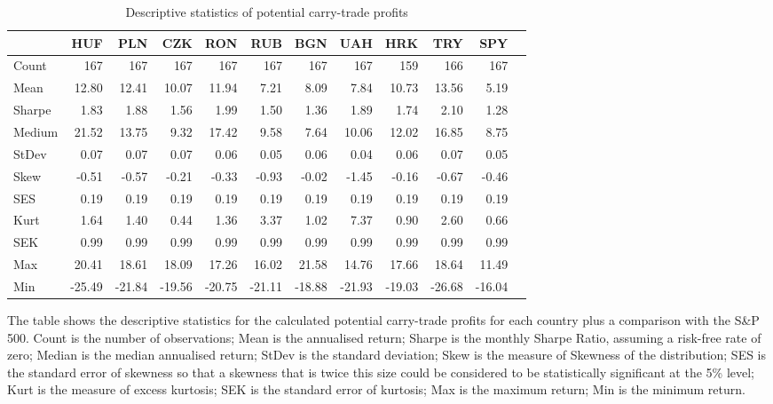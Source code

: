\documentclass[12pt, a4paper, oneside]{article}\usepackage[]{graphicx}\usepackage[]{color}
\begin{document}
\begin{sidewaystable}[p]
\begin{threeparttable}
\centering
\begin{tabular}{p{5cm}rrrrrrrrrrr}
  \hline
 & HUF & PLN & CZK & RON & RUB & BGN & UAH & HRK & TRY & SPY\\ 
  \hline
Count & 167 & 167 & 167 & 167 & 167 & 167 & 167 & 159 & 166 & 167\\ 
  Mean & 12.80 & 12.41 & 10.07 & 11.94 & 7.21 & 8.09 & 7.84 & 10.73 & 13.56 & 5.19\\ 
  Sharpe & 1.83 & 1.88 & 1.56 & 1.99 & 1.50 & 1.36 & 1.89 & 1.74 & 2.10 & 1.28 \\ 
  Medium & 21.52 & 13.75 & 9.32 & 17.42 & 9.58 & 7.64 & 10.06 & 12.02 & 16.85 & 8.75 \\ 
  StDev & 0.07 & 0.07 & 0.07 & 0.06 & 0.05 & 0.06 & 0.04 & 0.06 & 0.07 & 0.05 \\ 
  Skew & -0.51 & -0.57 & -0.21 & -0.33 & -0.93 & -0.02 & -1.45 & -0.16 & -0.67 & -0.46 \\ 
  SES & 0.19 & 0.19 & 0.19 & 0.19 & 0.19 & 0.19 & 0.19 & 0.19 & 0.19 & 0.19\\ 
  Kurt & 1.64 & 1.40 & 0.44 & 1.36 & 3.37 & 1.02 & 7.37 & 0.90 & 2.60 & 0.66\\ 
  SEK & 0.99 & 0.99 & 0.99 & 0.99 & 0.99 & 0.99 & 0.99 & 0.99 & 0.99 & 0.99\\ 
  Max & 20.41 & 18.61 & 18.09 & 17.26 & 16.02 & 21.58 & 14.76 & 17.66 & 18.64 & 11.49\\ 
  Min & -25.49 & -21.84 & -19.56 & -20.75 & -21.11 & -18.88 & -21.93 & -19.03 & -26.68 & -16.04\\ 
   \hline
\end{tabular}
\begin{tablenotes}
\small 
\item The table shows the descriptive statistics for the calculated potential carry-trade profits for each country plus a comparison with the S\&P 500. Count is the number of observations; Mean is the annualised return; Sharpe is the monthly Sharpe Ratio, assuming a risk-free rate of zero; Median is the median annualised return; StDev is the standard deviation; Skew is the measure of Skewness of the distribution; SES is the standard error of skewness so that a skewness that is twice this size could be considered to be statistically significant at the 5\% level; Kurt is the measure of excess kurtosis; SEK is the standard error of kurtosis; Max is the maximum return; Min is the minimum return. 
\end{tablenotes}
\caption{Descriptive statistics of potential carry-trade profits}
\label{tabref:desst}
\end{threeparttable}
\end{sidewaystable}
\end{document}
